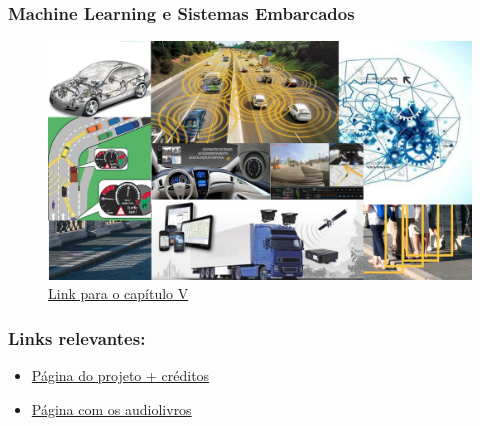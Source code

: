 \documentclass{beamer}
\begin{document}
\begin{frame}

    \frametitle{Machine Learning e Sistemas Embarcados}
    \begin{figure}[ht]
        \centering
        \includegraphics[scale=0.5]{Capitulo5.png}
        \caption{\href{run:./capitulos/Capitulo_05/Capitulo05.pdf}{Link para o capítulo V}}
    \end{figure}

\end{frame}
\begin{frame}

    \frametitle{Links relevantes:}
    \begin{itemize}
        \item \href{https://mysterys337.github.io/Trabalho-LDO-ML/}{Página do projeto + créditos}
        \item \href{https://soundcloud.com/gustavo-rodrigues-468052117/sets/ldo-machine-learning}{Página com os audiolivros}
    \end{itemize}
\end{frame}
\end{document}
